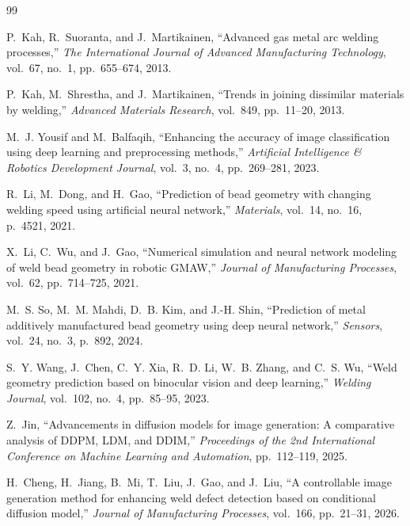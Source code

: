 \documentclass[12pt,a4paper,oneside]{report}
\begin{document}
\clearpage
{}
\begin{thebibliography}{99}

P.~Kah, R.~Suoranta, and J.~Martikainen,
``Advanced gas metal arc welding processes,''
\textit{The International Journal of Advanced Manufacturing Technology}, vol.~67, no.~1, pp.~655--674, 2013.

P.~Kah, M.~Shrestha, and J.~Martikainen,
``Trends in joining dissimilar materials by welding,''
\textit{Advanced Materials Research}, vol.~849, pp.~11--20, 2013.

M.~J. Yousif and M.~Balfaqih,
``Enhancing the accuracy of image classification using deep learning and preprocessing methods,''
\textit{Artificial Intelligence \& Robotics Development Journal}, vol.~3, no.~4, pp.~269--281, 2023.

R.~Li, M.~Dong, and H.~Gao,
``Prediction of bead geometry with changing welding speed using artificial neural network,''
\textit{Materials}, vol.~14, no.~16, p.~4521, 2021.

X.~Li, C.~Wu, and J.~Gao,
``Numerical simulation and neural network modeling of weld bead geometry in robotic GMAW,''
\textit{Journal of Manufacturing Processes}, vol.~62, pp.~714--725, 2021.

M.~S. So, M.~M. Mahdi, D.~B. Kim, and J.-H. Shin,
``Prediction of metal additively manufactured bead geometry using deep neural network,''
\textit{Sensors}, vol.~24, no.~3, p.~892, 2024.

S.~Y. Wang, J.~Chen, C.~Y. Xia, R.~D. Li, W.~B. Zhang, and C.~S. Wu,
``Weld geometry prediction based on binocular vision and deep learning,''
\textit{Welding Journal}, vol.~102, no.~4, pp.~85--95, 2023.

Z.~Jin,
``Advancements in diffusion models for image generation: A comparative analysis of DDPM, LDM, and DDIM,''
\textit{Proceedings of the 2nd International Conference on Machine Learning and Automation}, pp.~112--119, 2025.

H.~Cheng, H.~Jiang, B.~Mi, T.~Liu, J.~Gao, and J.~Liu,
``A controllable image generation method for enhancing weld defect detection based on conditional diffusion model,''
\textit{Journal of Manufacturing Processes}, vol.~166, pp.~21--31, 2026.


\end{thebibliography}
\end{document}
